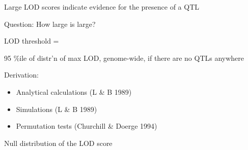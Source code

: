 \documentclass[12pt]{article}
\newcommand{\headsize}{\fontsize{35}{35} \selectfont}
\begin{document}
\hfill
\begin{minipage}{10in}
Large LOD scores indicate evidence for the presence of a QTL
\vspace{5mm}

{\color{mypink} Question}: How large is large?
\vspace{20mm}

{\color{myyellow} LOD threshold} =  \hspace{2mm}
\begin{minipage}[t]{7in}
\setlength{\rightskip}{0pt plus 1fil} %
95 \%ile of distr'n of max LOD, genome-wide, if there are no QTLs anywhere
\end{minipage}
\vspace{20mm}

\hspace{15mm} {\color{myyellow} Derivation:} \hfill
\begin{minipage}[t]{7.5in}
\begin{itemize}
\item Analytical calculations (L \& B 1989)
\item Simulations (L \& B 1989)
\item Permutation tests (Churchill \& Doerge 1994)
\end{itemize} \end{minipage}
\end{minipage}



\newpage

\headsize \color{myyellow}
\hfill \begin{minipage}{5.75in}
\centering
Null distribution of the LOD score
\end{minipage}

\vspace{3cm}
\end{document}
